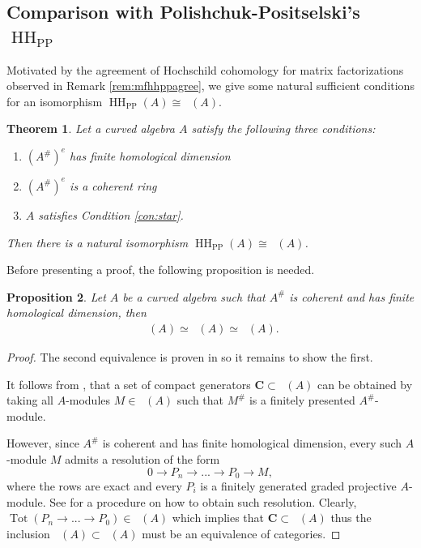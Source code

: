 \documentclass[a4paper]{amsart}
\theoremstyle{plain}
\newtheorem{thm}{Theorem}[section]
\newtheorem{prop}[thm]{Proposition}
\theoremstyle{definition}
\theoremstyle{remark}
\DeclareMathOperator{\DII}{D^{{II}}}%
\DeclareMathOperator{\Dco}{D^{co}}
\DeclareMathOperator{\Dctr}{D^{ctr}}
\DeclareMathOperator{\HH}{HH}
\DeclareMathOperator{\HHII}{HH^{\mathrm{II}}}
\DeclareMathOperator{\PerfII}{Perf^{\mathrm{II}}}
\numberwithin{equation}{section}
\theoremstyle{plain}
\begin{document}
	\subsection{Comparison with Polishchuk-Positselski's $\HH_{\mathrm{PP}}$}\label{sect:hhpp}
	
	Motivated by the agreement of Hochschild cohomology for matrix factorizations observed in Remark \ref{rem:mfhhppagree},
	we give some natural sufficient conditions for an isomorphism $\HH_{\mathrm{PP}}(A) \cong \HHII(A)$.
	\begin{thm}\label{thm:comp HH_PP and HH2}
		Let a curved algebra $A$ satisfy the following three conditions:
		\begin{enumerate}
			\item $(A^\#)^e$ has finite homological dimension
			\item $(A^\#)^e$ is a coherent ring
			\item $A$ satisfies Condition \ref{con:star}. \label{con:three}
		\end{enumerate}
		Then there is a natural isomorphism $\HH_{\mathrm{PP}}(A) \cong \HHII(A)$. %
	\end{thm}
	Before presenting a proof, the following proposition is needed.
	\begin{prop}\label{comp:DII and Dco}
		Let $A$ be a curved algebra such that $A^\#$ is coherent and has finite homological dimension, then
		\begin{align}
			\DII(A)\simeq \Dco(A)\simeq \Dctr(A).
		\end{align} 
	\end{prop}
	\begin{proof}
		The second equivalence is proven in \cite[Theorem 3.6]{pos11} so it remains to show the first.
		
		 It follows from \cite[Corollary 8.20]{PositselskiStovicek2024}, that a set of compact generators $\textbf{C}\subset \Dco(A)$ can be obtained by taking all $A$-modules $M\in \Dco(A)$ such that $M^\#$ is a finitely presented $A^\#$-module.
		 
		 However, since $A^\#$ is coherent and has finite homological dimension, every such $A$-module $M$ admits a resolution of the form
		 $$0\to P_n\to ...\to P_0\to M,$$
		 where the rows are exact and every $P_i$ is a finitely generated graded projective $A$-module. See \cite[Theorem 3.6]{pos11} for a procedure on how to obtain such resolution. Clearly, $\operatorname{Tot}(P_n\to ...\to P_0)\in \PerfII(A)$ which implies that $\textbf{C}\subset \PerfII(A)$ thus the inclusion $\DII(A)\subset \Dco(A)$ must be an equivalence of categories.
	\end{proof}
\end{document}
